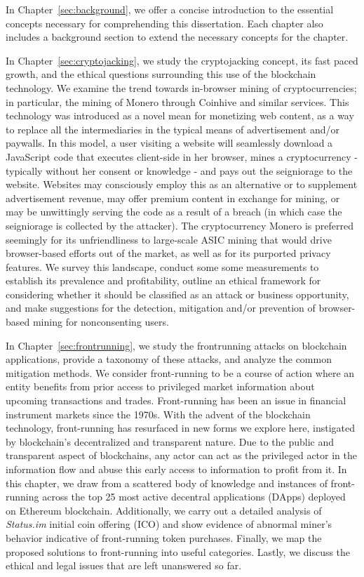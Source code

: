 In Chapter~\ref{sec:background}, we offer a concise introduction to the essential concepts necessary for comprehending this dissertation. Each chapter also includes a background section to extend the necessary concepts for the chapter.

In Chapter~\ref{sec:cryptojacking}, we study the cryptojacking concept, its fast paced growth, and the ethical questions surrounding this use of the blockchain technology. We examine the trend towards in-browser mining of cryptocurrencies; in particular, the mining of Monero through Coinhive and similar services. This technology was introduced as a novel mean for monetizing web content, as a way to replace all the intermediaries in the typical means of advertisement and/or paywalls. In this model, a user visiting a website will seamlessly download a JavaScript code that executes client-side in her browser, mines a cryptocurrency - typically without her consent or knowledge - and pays out the seigniorage to the website. Websites may consciously employ this as an alternative or to supplement advertisement revenue, may offer premium content in exchange for mining, or may be unwittingly serving the code as a result of a breach (in which case the seigniorage is collected by the attacker). The cryptocurrency Monero is preferred seemingly for its unfriendliness to large-scale ASIC mining that would drive browser-based efforts out of the market, as well as for its purported privacy features. We survey this landscape, conduct some some measurements to establish its prevalence and profitability, outline an ethical framework for considering whether it should be classified as an attack or business opportunity, and make suggestions for the detection, mitigation and/or prevention of browser-based mining for nonconsenting users.


In Chapter~\ref{sec:frontrunning}, we study the frontrunning attacks on blockchain applications, provide a taxonomy of these attacks, and analyze the common mitigation methods. We consider front-running to be a course of action where an entity benefits from prior access to privileged market information about upcoming transactions and trades. Front-running has been an issue in financial instrument markets since the 1970s. With the advent of the blockchain technology, front-running has resurfaced in new forms we explore here, instigated by blockchain’s decentralized and transparent nature. Due to the public and transparent aspect of blockchains, any actor can act as the privileged actor in the information flow and abuse this early access to information to profit from it. In this chapter, we draw from a scattered body of knowledge and instances of front-running across the top 25 most active decentral applications (DApps) deployed on Ethereum blockchain. Additionally, we carry out a detailed analysis of \textit{Status.im} initial coin offering (ICO) and show evidence of abnormal miner’s behavior indicative of front-running token purchases. Finally, we map the proposed solutions to front-running into useful categories. Lastly, we discuss the ethical and legal issues that are left unanswered so far.


